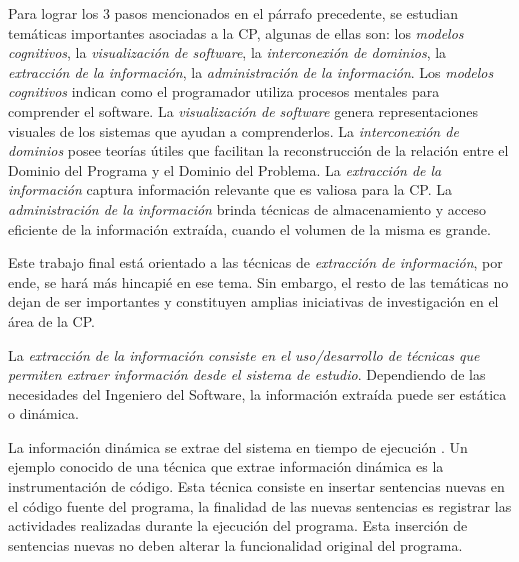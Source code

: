 \documentclass[a4paper,12pt]{article}
\begin{document}
\hspace{0.5cm} Para lograr los 3 pasos mencionados en el párrafo precedente, se estudian temáticas importantes asociadas a la CP, algunas de ellas son: los \textit{modelos cognitivos}, la \textit{visualización de software}, la \textit{interconexión de dominios}, la \textit{extracción de la información}, la \textit{administración de la información}. Los \textit{modelos cognitivos} indican como el programador utiliza procesos mentales para comprender el software. La \textit{visualización de software} genera representaciones visuales de los sistemas que ayudan a comprenderlos. La \textit{interconexión de dominios} posee teorías útiles que facilitan la reconstrucción de la relación entre el Dominio del Programa y el Dominio del Problema. La \textit{extracción de la información} captura información relevante que es valiosa para la CP. La \textit{administración de la información} brinda técnicas de almacenamiento y acceso eficiente de la información extraída, cuando el volumen de la misma es grande.

\hspace{0.5cm} Este trabajo final está orientado a las técnicas de \textit{extracción de información}, por ende, se hará más hincapié en ese tema. Sin embargo, el resto de las temáticas no dejan de ser importantes y constituyen amplias iniciativas de investigación en el área de la CP.

\hspace{0.5cm} La \textit{extracción de la información consiste en el uso/desarrollo de técnicas que permiten extraer información desde el sistema de estudio}. Dependiendo de las necesidades del Ingeniero del Software, la información extraída puede ser estática o dinámica.
 
\hspace{0.5cm}La información dinámica se extrae del sistema en tiempo de ejecución \cite{THBE99, TERD01}. Un ejemplo conocido de una técnica que extrae información dinámica es la instrumentación de código. Esta técnica consiste en insertar sentencias nuevas en el código fuente del programa, la finalidad de las nuevas sentencias es registrar las actividades realizadas durante la ejecución del programa. Esta inserción de sentencias nuevas no deben alterar la funcionalidad original del programa.
\end{document}
